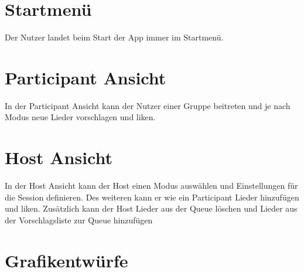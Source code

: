 \documentclass[oneside, ngerman]{sdqtechreport}
\begin{document}
\section{Startmenü}
\label{sec:Benutzeroberfläche:Startmenü}
Der Nutzer landet beim Start der App immer im Startmenü.

\section{Participant Ansicht}
\label{sec:Benutzeroberfläche:participantAnsicht}
In der Participant Ansicht kann der Nutzer einer Gruppe beitreten und je nach Modus neue Lieder vorschlagen und liken.

\section{Host Ansicht}
\label{sec:Benutzeroberfläche:hostAnsicht}
In der Host Ansicht kann der Host einen Modus auswählen und Einstellungen für die Session definieren. Des weiteren kann er wie ein Participant Lieder hinzufügen und liken. Zusätzlich kann der Host Lieder aus der Queue löschen und Lieder aus der Vorschlagsliste zur Queue hinzufügen

\section{Grafikentwürfe}
\label{sec:Benutzeroberfläche:Grafikentwürfe}
\end{document}
